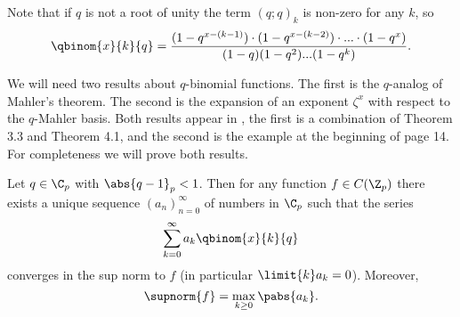 Note that if  $q$ is not a root of unity the term $(q;q)_k$ is non-zero for any $k$, so
\[\qbinom{x}{k}{q}=\frac{(1-q^{x-(k-1)})\cdot(1-q^{x-(k-2)})\cdot...\cdot(1-q^x)}{(1-q)(1-q^2)...(1-q^k)}.\]

We will need two results about $q$-binomial functions.
The first is the $q$-analog of Mahler's theorem.
The second is the expansion of an exponent $\zeta^x$ with respect to the $q$-Mahler basis.
Both results appear in \cite{conrad2000q}, the first is a combination of Theorem 3.3 and Theorem 4.1, and the second is the example at the beginning of page 14.
For completeness we will prove both results.
\begin{thm}\label{q_Mahler}
Let $q\in\C_p$ with $\abs{q-1}_p<1$.
Then for any function $f\in C(\Z_p)$ there exists a unique sequence $(a_n)_{n=0}^\infty$ of numbers in $\C_p$ such that the series
\[\sum_{k=0}^\infty a_k\qbinom{x}{k}{q}\]
converges in the sup norm to $f$ (in particular $\limit{k}a_k=0$).
Moreover,
\[\supnorm{f}=\max_{k\geq 0}\pabs{a_k}.\]
\end{thm} 
